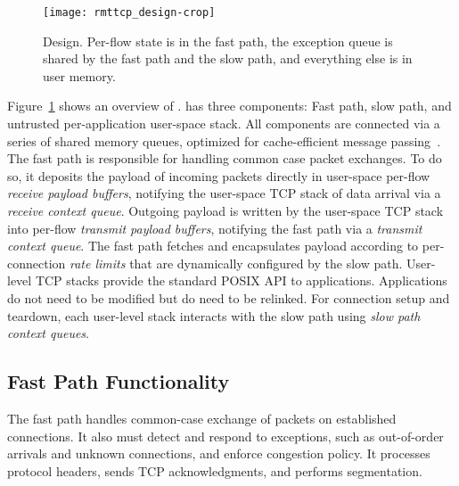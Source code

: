 \begin{compactitem}[\labelitemi]
\end{compactitem}

\begin{figure}
  \centering
  \texttt{[image: rmttcp\_design-crop]}
  \caption{\softtcp Design. Per-flow state is in the fast path, the exception
    queue is shared by the fast path and the slow path, and everything else
    is in user memory.}
  \label{fig:softtcp}
\end{figure}

Figure~\ref{fig:softtcp} shows an overview of \softtcp. \softtcp has
three components: Fast path, slow path, and untrusted per-application
user-space stack. All components are connected via a series of shared
memory queues, optimized for cache-efficient message
passing~\cite{barrelfish}. The fast path is responsible for handling
common case packet exchanges. To do so, it deposits the payload of
incoming packets directly in user-space per-flow \emph{receive payload
  buffers}, notifying the user-space TCP stack of data arrival via a
\emph{receive context queue}. Outgoing payload is written by the
user-space TCP stack into per-flow \emph{transmit payload buffers},
notifying the fast path via a \emph{transmit context queue}. The fast
path fetches and encapsulates payload according to per-connection
\emph{rate limits} that are dynamically configured by the slow path.
User-level TCP stacks provide the standard POSIX API to applications.
Applications do not need to be modified but do need to be relinked.
For connection setup and teardown, each user-level stack interacts
with the slow path using \emph{slow path context queues}.

\subsection{Fast Path Functionality}

The fast path handles common-case exchange of packets on established
connections. It also must detect and respond to exceptions, such as
out-of-order arrivals and unknown connections, and enforce congestion
policy. It processes protocol headers, sends TCP acknowledgments, and
performs segmentation.

